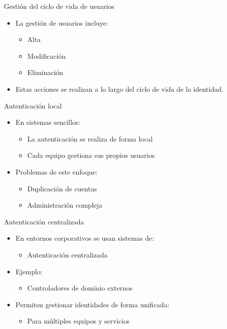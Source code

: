 \documentclass{beamer}
\begin{document}
\begin{frame}{Gestión del ciclo de vida de usuarios}
\begin{itemize}
  \item La gestión de usuarios incluye:
  \begin{itemize}
    \item Alta
    \item Modificación
    \item Eliminación
  \end{itemize}
  \item Estas acciones se realizan a lo largo del ciclo de vida de la identidad.
\end{itemize}
\end{frame}

\begin{frame}{Autenticación local}
\begin{itemize}
  \item En sistemas sencillos:
  \begin{itemize}
    \item La autenticación se realiza de forma local
    \item Cada equipo gestiona sus propios usuarios
  \end{itemize}
  \item Problemas de este enfoque:
  \begin{itemize}
    \item Duplicación de cuentas
    \item Administración compleja
  \end{itemize}
\end{itemize}
\end{frame}

\begin{frame}{Autenticación centralizada}
\begin{itemize}
  \item En entornos corporativos se usan sistemas de:
  \begin{itemize}
    \item Autenticación centralizada
  \end{itemize}
  \item Ejemplo:
  \begin{itemize}
    \item Controladores de dominio externos
  \end{itemize}
  \item Permiten gestionar identidades de forma unificada:
  \begin{itemize}
    \item Para múltiples equipos y servicios
  \end{itemize}
\end{itemize}
\end{frame}
\end{document}
